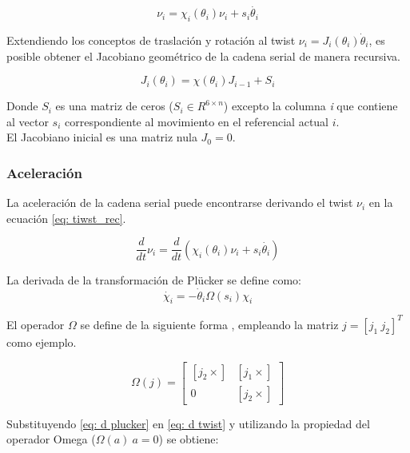\begin{equation} \label{eq: tiwst_rec}
\nu_i = \chi_i(\theta_i)\nu_i + s_i\dot{\theta_i}
\end{equation}

Extendiendo los conceptos de traslación y rotación al twist 
$  \nu_i = J_i( {\theta_i})  {\dot \theta_i}$, 
es posible obtener el Jacobiano geométrico 
de la cadena serial de manera recursiva. 

\begin{equation}
J_i(\theta_i) = \chi(\theta_i) J_{i-1} + S_i
\end{equation}

Donde $S_i$ es una matriz de ceros 
($S_i \in R^{6\times n}$) excepto la columna 
\emph{i} que contiene al vector $s_i$ correspondiente 
al movimiento en el referencial actual $i$.\\
El Jacobiano inicial es una matriz nula $J_0 = 0$.

\subsubsection{Aceleración}

La aceleración de la cadena serial puede 
encontrarse derivando el twist $\nu_i$ en la ecuación 
\eqref{eq: tiwst_rec}.

\begin{equation}\label{eq: d twist}
\dfrac{d}{dt} \nu_i = \frac{d}{dt} (\chi_i(\theta_i)\nu_i + s_i\dot{\theta_i})
\end{equation}

La derivada de la transformación de Plücker 
se define como:
\begin{equation}\label{eq: d plucker}
\dot{\chi_i} = -\dot \theta_i \Omega(s_i) \chi_i
\end{equation}

El operador $\Omega$ se define de la siguiente forma
\cite{olguin2019multibody}, empleando la matriz 
$  j = [  j_1 \   j_2]^T$
como ejemplo.

\begin{equation}\label{eq: Omega}
 \Omega(  j) = \begin{bmatrix}
          [  j_2 \times] & [  j_1 \times] \\
          0 & [  j_2 \times]
          \end{bmatrix}
\end{equation}

Substituyendo \eqref{eq: d plucker} 
en \eqref{eq: d twist} 
y utilizando la propiedad del operador Omega
($\Omega(a) \ a = 0$)
\cite{olguin2019stewart}
se obtiene: 

